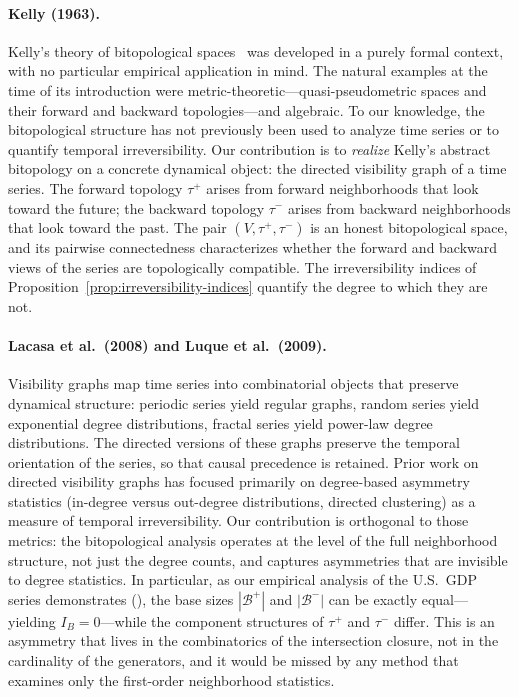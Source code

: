 \documentclass[11pt,a4paper]{article}
\theoremstyle{plain}
\theoremstyle{definition}
\newcommand{\taufwd}{\tau^{+}}
\newcommand{\taubwd}{\tau^{-}}
\newcommand{\base}{\mathcal{B}}
\begin{document}
\paragraph{Kelly (1963).}
Kelly's theory of bitopological spaces~\cite{Kelly1963} was developed
in a purely formal context, with no particular empirical application
in mind. The natural examples at the time of its introduction were
metric-theoretic---quasi-pseudometric spaces and their forward and
backward topologies---and algebraic. To our knowledge, the
bitopological structure has not previously been used to analyze time
series or to quantify temporal irreversibility. Our contribution is to
\emph{realize} Kelly's abstract bitopology on a concrete dynamical
object: the directed visibility graph of a time series. The forward
topology $\taufwd$ arises from forward neighborhoods that look toward
the future; the backward topology $\taubwd$ arises from backward
neighborhoods that look toward the past. The pair
$(V, \taufwd, \taubwd)$ is an honest bitopological space, and its
pairwise connectedness characterizes whether the forward and backward
views of the series are topologically compatible. The irreversibility
indices of Proposition~\ref{prop:irreversibility-indices} quantify the
degree to which they are not.

\paragraph{Lacasa et al.\ (2008) and Luque et al.\ (2009).}
Visibility graphs map time series into combinatorial objects that
preserve dynamical structure: periodic series yield regular graphs,
random series yield exponential degree distributions, fractal series
yield power-law degree distributions. The directed versions of these
graphs preserve the temporal orientation of the series, so that causal
precedence is retained. Prior work on directed visibility graphs has
focused primarily on degree-based asymmetry statistics
(in-degree versus out-degree distributions, directed clustering) as a
measure of temporal irreversibility. Our contribution is orthogonal to
those metrics: the bitopological analysis operates at the level of the
full neighborhood structure, not just the degree counts, and captures
asymmetries that are invisible to degree statistics. In particular, as
our empirical analysis of the U.S.\ GDP series demonstrates
(), the base sizes $|\base^{+}|$ and $|\base^{-}|$
can be exactly equal---yielding $I_{B} = 0$---while the component
structures of $\taufwd$ and $\taubwd$ differ. This is an asymmetry that
lives in the combinatorics of the intersection closure, not in the
cardinality of the generators, and it would be missed by any method
that examines only the first-order neighborhood statistics.
\end{document}

